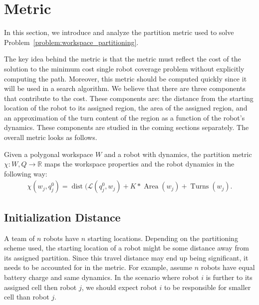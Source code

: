 \documentclass[../main.tex]{subfiles}
\begin{document}
\section{Metric}
\label{sec:metric}

In this section, we introduce and analyze the partition metric used to solve Problem~\ref{problem:workspace_partitioning}.

The key idea behind the metric is that the metric must reflect the cost of the solution to the minimum cost single robot coverage problem without explicitly computing the path. Moreover, this metric should be computed quickly since it will be used in a search algorithm. We believe that there are three components that contribute to the cost. These components are: the distance from the starting location of the robot to its assigned region, the area of the assigned region, and an approximation of the turn content of the region as a function of the robot's dynamics. These components are studied in the coming sections separately. The overall metric looks as follows.

\begin{definition}
Given a polygonal workspace $W$ and a robot with dynamics, the partition metric $\chi:W,Q\to\mathbb{R}$ maps the workspace properties and the robot dynamics in the following way:
	\begin{equation}
		\begin{aligned}
			\chi(w_j,q_j^0)=\operatorname{dist}(\mathcal{L}(q^0_j,w_j)+K*\operatorname{Area}(w_j)+\operatorname{Turns}(w_j).
		\end{aligned}
	\end{equation}
\end{definition}


\subsection{Initialization Distance}

A team of $n$ robots have $n$ starting locations. Depending on the partitioning scheme used, the starting location of a robot might be some distance away from its assigned partition. Since this travel distance may end up being significant, it needs to be accounted for in the metric. For example, assume $n$ robots have equal battery charge and same dynamics. In the scenario where robot $i$ is further to its assigned cell then robot $j$, we should expect robot $i$ to be responsible for smaller cell than robot $j$.
\end{document}
